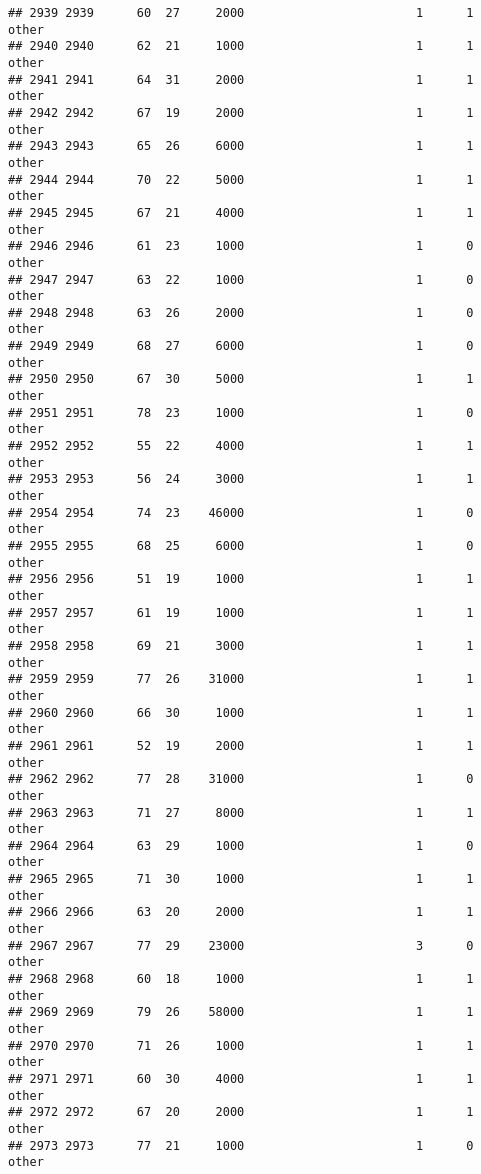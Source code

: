 \documentclass[
]{article}
\begin{document}
\begin{verbatim}
## 2939 2939      60  27     2000                        1      1    other
## 2940 2940      62  21     1000                        1      1    other
## 2941 2941      64  31     2000                        1      1    other
## 2942 2942      67  19     2000                        1      1    other
## 2943 2943      65  26     6000                        1      1    other
## 2944 2944      70  22     5000                        1      1    other
## 2945 2945      67  21     4000                        1      1    other
## 2946 2946      61  23     1000                        1      0    other
## 2947 2947      63  22     1000                        1      0    other
## 2948 2948      63  26     2000                        1      0    other
## 2949 2949      68  27     6000                        1      0    other
## 2950 2950      67  30     5000                        1      1    other
## 2951 2951      78  23     1000                        1      0    other
## 2952 2952      55  22     4000                        1      1    other
## 2953 2953      56  24     3000                        1      1    other
## 2954 2954      74  23    46000                        1      0    other
## 2955 2955      68  25     6000                        1      0    other
## 2956 2956      51  19     1000                        1      1    other
## 2957 2957      61  19     1000                        1      1    other
## 2958 2958      69  21     3000                        1      1    other
## 2959 2959      77  26    31000                        1      1    other
## 2960 2960      66  30     1000                        1      1    other
## 2961 2961      52  19     2000                        1      1    other
## 2962 2962      77  28    31000                        1      0    other
## 2963 2963      71  27     8000                        1      1    other
## 2964 2964      63  29     1000                        1      0    other
## 2965 2965      71  30     1000                        1      1    other
## 2966 2966      63  20     2000                        1      1    other
## 2967 2967      77  29    23000                        3      0    other
## 2968 2968      60  18     1000                        1      1    other
## 2969 2969      79  26    58000                        1      1    other
## 2970 2970      71  26     1000                        1      1    other
## 2971 2971      60  30     4000                        1      1    other
## 2972 2972      67  20     2000                        1      1    other
## 2973 2973      77  21     1000                        1      0    other

\end{verbatim}
\end{document}
